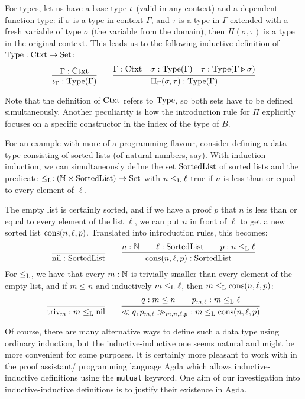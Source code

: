 \documentclass[orivec,envcountsame, ,envcountsect]{llncs}
\begin{document}
For types, let us have a base type $\iota_{}$ (valid in any context)
and a dependent function type: if $\sigma$ is a type in context $\Gamma$,
and $\tau$ is a type in $\Gamma$ extended with a fresh variable of type
$\sigma$ (the variable from the domain), then $\Pi(\sigma, \tau)$ is a
type in the original context. This leads us to the following inductive
definition of $\text{Type} : \text{Ctxt} \to \text{Set}$:
\[
\infer{\baseTy{\Gamma} : \Type(\Gamma)}{\Gamma : \Ctxt} \qquad
\infer{\piTy{\Gamma}{\sigma}{\tau} : \Type(\Gamma)}{\Gamma : \Ctxt
                    & \sigma : \Type(\Gamma)
                    & \tau : \Type(\consCtxt{\Gamma}{\sigma})}
\]

Note that the definition of $\text{Ctxt}$ refers to $\text{Type}$, so both sets
have to be defined simultaneously. Another peculiarity is how the
introduction rule for $\Pi$ explicitly focuses on a specific
constructor in the index of the type of $B$.

For an example with more of a programming flavour, consider defining a
data type consisting of sorted lists (of natural numbers, say). With
induction-induction, we can simultaneously define the set
$\text{SortedList}$ of sorted lists and the predicate $\leq_{\text{L}} : (\mathbb{N}
\times \text{SortedList}) \to \text{Set}$ with $n \leq_{\text{L}} \ell$ true if $n$ is
less than or equal to every element of $\ell$.

The empty list is certainly sorted, and if we have a proof $p$ that
$n$ is less than or equal to every element of the list $\ell$, we can
put $n$ in front of $\ell$ to get a new sorted list
$\text{cons}(n, \ell, p)$. Translated into introduction rules, this becomes:
\[
\infer{\nilList : \SortedList}{} \qquad
\infer{\consList{n}{\ell}{p} : \SortedList}{n : \Nat \quad & \ell : \SortedList \quad & p : n \lessList \ell}
\]
For $\leq_{\text{L}}$, we have that every $m : \mathbb{N}$ is trivially smaller
than every element of the empty list, and if $m \leq n$ and
inductively $m \leq_{\text{L}} \ell$, then $m \leq_{\text{L}} \text{cons}(n, \ell, p)$:
\[
\infer{\nilLess{m} : m \lessList \nilList}
{} \qquad
\infer{\consLess{n}{\ell}{p}{m}{q}{p_{m, \ell}}\ : m \lessList \consList{n}{\ell}{p}}
       {q : m \leq n \quad & p_{m, \ell} : m \lessList \ell}
\]

Of course, there are many alternative ways to define such a data type
using ordinary induction, but the inductive-inductive one seems
natural and might be more convenient for some purposes. It is
certainly more pleasant to work with in the proof assistant/
programming language Agda \cite{norell2007thesis} which allows
inductive-inductive definitions using the \texttt{mutual} keyword. One
aim of our investigation into inductive-inductive definitions is to
justify their existence in Agda.
\end{document}

